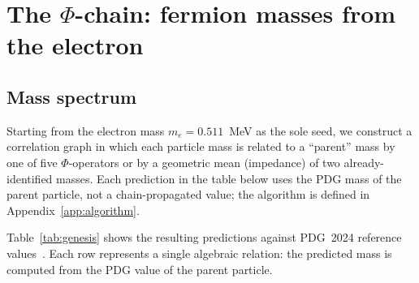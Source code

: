 \documentclass[11pt,a4paper]{article}
\begin{document}
\section{The \texorpdfstring{$\Phi$}{Phi}-chain: fermion masses from the electron}
\label{sec:chain}

\subsection{Mass spectrum}
\label{sec:spectrum}

Starting from the electron mass $m_e = 0.511$~MeV as the sole seed,
we construct a correlation graph in which each particle mass is
related to a ``parent'' mass by one of five $\Phi$-operators or by a
geometric mean (impedance) of two already-identified masses.
Each prediction in the table below uses the PDG mass of the
parent particle, not a chain-propagated value; the algorithm
is defined in Appendix~\ref{app:algorithm}.

Table~\ref{tab:genesis} shows the resulting predictions against
PDG~2024 reference values~\cite{PDG2024}. Each row represents a
single algebraic relation: the predicted mass is computed from the
PDG value of the parent particle.
\end{document}
